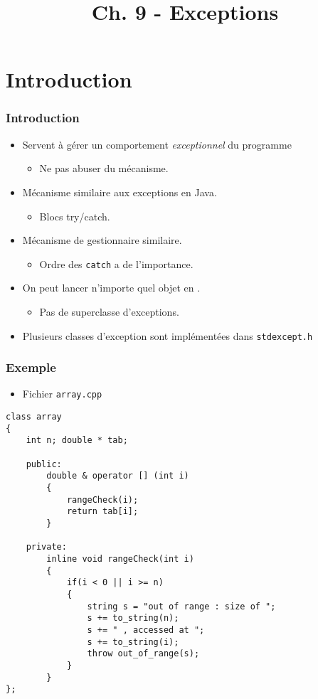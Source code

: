 


\title{Ch. 9 - Exceptions}




\section{Introduction}


\begin{frame}
\frametitle{Introduction}
\begin{itemize}[<+->]
\item Servent à gérer un comportement \emph{exceptionnel} du programme
	\begin{itemize}
	\item Ne pas abuser du mécanisme.
	\end{itemize}
\item Mécanisme similaire aux exceptions en Java.
	\begin{itemize}
	\item Blocs try/catch.
	\end{itemize}
\item Mécanisme de gestionnaire similaire.
	\begin{itemize}
	\item Ordre des \texttt{catch} a de l'importance.
	\end{itemize}
\item On peut lancer n'importe quel objet en \cpp.
	\begin{itemize}
	\item Pas de superclasse d'exceptions.
	\end{itemize}
\item Plusieurs classes d'exception sont implémentées dans \texttt{stdexcept.h}
\end{itemize}
\end{frame}

\begin{frame}[containsverbatim]
\frametitle{Exemple}
\begin{itemize}
\item Fichier \texttt{array.cpp}
\end{itemize}
\begin{lstlisting}
class array
{
	int n; double * tab;
	
	public:
		double & operator [] (int i)
		{
			rangeCheck(i);
			return tab[i];
		}

	private:
		inline void rangeCheck(int i)
		{
			if(i < 0 || i >= n)
			{
				string s = "out of range : size of ";
				s += to_string(n);
				s += " , accessed at ";
				s += to_string(i);
				throw out_of_range(s);
			}
		}
};
\end{lstlisting}
\end{frame}

